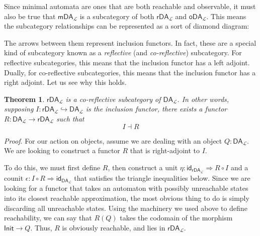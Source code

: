 \documentclass{article}
\theoremstyle{plain}
\newtheorem{theorem}{Theorem}
\theoremstyle{definition}
\begin{document}
Since minimal automata are ones that are both reachable and observable, it must also be true that \ensuremath{{\mathsf{mDA}}_{\mathcal{L}}} is a subcategory of both \ensuremath{{\mathsf{rDA}}_{\mathcal{L}}} and \ensuremath{{\mathsf{oDA}}_{\mathcal{L}}}. This means the subcategory relationships can be represented as a sort of diamond diagram:


\begin{center}
\end{center}


The arrows between them represent inclusion functors. In fact, these are a special kind of subcategory known as a \emph{reflective} (and \emph{co-reflective}) subcategory. For reflective subcategories, this means that the inclusion functor has a left adjoint. Dually, for co-reflective subcategories, this means that the inclusion functor has a right adjoint. Let us see why this holds.

\begin{theorem}
\ensuremath{{\mathsf{rDA}}_{\mathcal{L}}} is a co-reflective subcategory of \ensuremath{{\mathsf{DA}}_{\mathcal{L}}}. In other words, supposing \ensuremath{I : {\mathsf{rDA}}_{\mathcal{L}} \hookrightarrow {\mathsf{DA}}_{\mathcal{L}}} is the inclusion functor, there exists a functor \ensuremath{R : {\mathsf{DA}}_{\mathcal{L}} \rightarrow {\mathsf{rDA}}_{\mathcal{L}}} such that \[
I \dashv R
\]
\end{theorem}
\label{rDALCoreflectiveSubcategory} 

\emph{Proof}.    For our action on objects, assume we are dealing with an object \ensuremath{Q : {\mathsf{DA}}_{\mathcal{L}}}. We are looking to construct a functor \ensuremath{R} that is right-adjoint to \ensuremath{I}.



To do this, we must first define \ensuremath{R}, then construct a unit \ensuremath{\eta : {\mathsf{id}}_{{\mathsf{rDA}}_{\mathcal{L}}} \Rightarrow R \circ I} and a counit \ensuremath{\epsilon : I \circ R \Rightarrow {\mathsf{id}}_{{\mathsf{DA}}_{\mathcal{L}}}} that satisfies the triangle inequalities below. Since we are looking for a functor that takes an automaton with possibly unreachable states into its closest reachable approximation, the most obvious thing to do is simply discarding all unreachable states. Using the machinery we used above to define reachability, we can say that \ensuremath{R\left( Q \right)} takes the codomain of the morphism \ensuremath{\mathsf{Init} \rightarrow Q}. Thus, \ensuremath{R} is obviously reachable, and lies in \ensuremath{{\mathsf{rDA}}_{\mathcal{L}}}.
\end{document}
